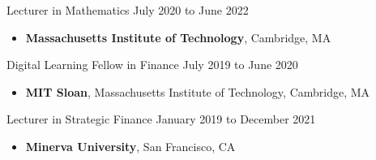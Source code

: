 \documentclass[11pt]{article}
\newenvironment{innerlist}[1][\enskip\textbullet]%
        {\begin{itemize}[#1,leftmargin=*,parsep=0pt,itemsep=0pt,topsep=0pt,partopsep=0pt]}
        {\end{itemize}}
\begin{document}
Lecturer in Mathematics \hfill{July 2020 to June 2022} 
\begin{innerlist}
	\item[] \textbf{Massachusetts Institute of Technology}, Cambridge, MA
\end{innerlist}

\vspace{2pt}

Digital Learning Fellow in Finance \hfill {July 2019 to June 2020}
\begin{innerlist}
	\item[] \textbf{MIT Sloan}, Massachusetts Institute of Technology, Cambridge, MA
\end{innerlist}

\vspace{2pt}

Lecturer in Strategic Finance \hfill {January 2019 to December 2021}
\begin{innerlist}
	\item[] \textbf{Minerva University}, San Francisco, CA
\end{innerlist}

\vspace{2pt}
\end{document}
